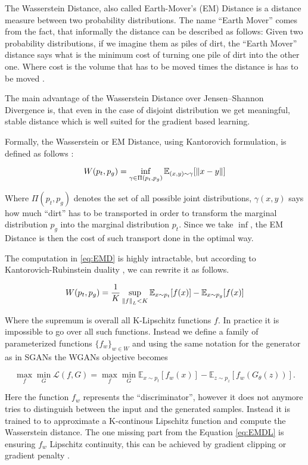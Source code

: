 The Wasserstein Distance, also called Earth-Mover's (EM) Distance is a distance
measure between two probability distributions. The name ``Earth Mover'' comes
from the fact, that informally the distance can be described as follows: Given
two probability distributions, if we imagine them as piles of dirt, the ``Earth
Mover'' distance says what is the minimum cost of turning one pile of dirt into the
other one. Where cost is the volume that has to be moved times the distance is
has to be moved \cite{villani@optimal}.

The main advantage of the Wasserstein Distance over Jensen–Shannon Divergence is,
that even in the case of disjoint distribution we get meaningful, stable
distance which is well suited for the gradient based learning.

Formally, the Wasserstein or EM Distance, using Kantorovich formulation, is
defined as follows \cite{villani@optimal}:

\begin{equation}
  \label{eq:EMD}
  W(p_t, p_g) = \inf_{\gamma \in \Pi(p_t, p_g)} \mathbb{E}_{(x, y) \sim \gamma}[\left\lVert x-y\right\rVert]
\end{equation}

Where $\Pi(p_t, p_g)$ denotes the set of all possible joint distributions,
$\gamma(x,y)$ says how much ``dirt'' has to be transported in order to transform
the marginal distribution $p_g$ into the marginal distribution $p_t$. Since we take $\inf$, the EM Distance is then the cost of such
transport done in the optimal way. 

The computation in \eqref{eq:EMD} is highly intractable, but according to
Kantorovich-Rubinstein duality \cite{villani@optimal}, we can rewrite it as
follows.

\begin{equation}
  \label{eq:EMD2}
  W(p_t, p_g) = \frac{1}{K} \sup_{\left\lVert f\right\rVert_L < K} \mathbb{E}_{x \sim p_t}[f(x)] - \mathbb{E}_{x \sim p_g}[f(x)]
\end{equation}

Where the supremum is overall all K-Lipschitz functions $f$. In practice it is
impossible to go over all such functions. Instead we define a family of parameterized
functions $\{f_{w}\}_{w \in W}$ and using the same notation for the generator as
in SGANs the WGANs objective becomes


\begin{equation}
  \label{eq:EMDL}
  \max_{f}\min_{G}\mathcal{L}(f, G) = \max_{f}\min_{G}  \mathbb{E}_{x \sim p_t}[f_w(x)] - \mathbb{E}_{z \sim p_z}[f_w(G_{\theta}(z))].
\end{equation}

Here the function $f_w$ represents the ``discriminator'', however it does not
anymore tries to distinguish between the input and the generated samples. Instead it is
trained to to approximate a K-continous Lipschitz function and compute the
Wasserstein distance. The one missing part from the Equation \eqref{eq:EMDL} is
ensuring $f_w$ Lipschitz continuity, this can be achieved by gradient
clipping \cite{arjovsky2017wasserstein} or gradient penalty \cite{gulrajani2017improved}.

